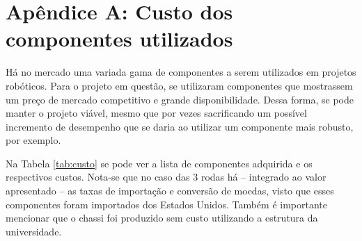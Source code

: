 
\cleardoublepage
\section*{Apêndice A: Custo dos componentes utilizados}
\label{sec:custo}

Há no mercado uma variada gama de componentes a serem utilizados em projetos robóticos. Para o projeto em questão, se utilizaram componentes que mostrassem um preço de mercado competitivo e grande disponibilidade. Dessa forma, se pode manter o projeto viável, mesmo que por vezes sacrificando um possível incremento de desempenho que se daria ao utilizar um componente mais robusto, por exemplo.

Na Tabela \ref{tab:custo} se pode ver a lista de componentes adquirida e os respectivos custos. Nota-se que no caso das 3 rodas há -- integrado ao valor apresentado -- as taxas de importação e conversão de moedas, visto que esses componentes foram importados dos Estados Unidos. Também é importante mencionar que o chassi foi produzido sem custo utilizando a estrutura da universidade.

